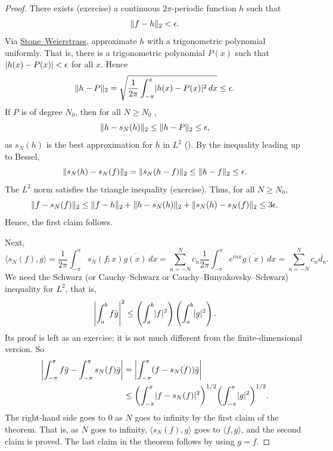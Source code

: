 \begin{proof}
There exists (exercise)
a continuous $2\pi$-periodic function $h$ such that
\begin{equation*}
\lVert {f-h} \rVert_2 < \epsilon .
\end{equation*}
Via \hyperref[thm:SWcomplex]{Stone--Weierstrass},
approximate $h$ with a trigonometric polynomial
uniformly.  That is, there is a trigonometric polynomial $P(x)$
such that
$\lvert {h(x) - P(x)} \rvert < \epsilon$ for all $x$.
Hence
\begin{equation*}
\lVert {h-P} \rVert_2
=
\sqrt{
\frac{1}{2\pi}
\int_{-\pi}^{\pi}
\lvert {h(x)-P(x)} \rvert^2
\,
dx
}
\leq \epsilon.
\end{equation*}
If $P$ is of degree $N_0$, then for all $N \geq N_0$ ,
\begin{equation*}
\lVert {h-s_N(h)} \rVert_2 \leq \lVert {h-P} \rVert_2 \leq \epsilon ,
\end{equation*}
as $s_N(h)$ is the best approximation for $h$ in $L^2$ ().
By the inequality leading up to Bessel,
\begin{equation*}
\lVert {s_N(h)-s_N(f)} \rVert_2
=
\lVert {s_N(h-f)} \rVert_2
\leq
\lVert {h-f} \rVert_2 \leq \epsilon .
\end{equation*}
The $L^2$ norm satisfies the triangle inequality (exercise).
Thus, for all $N \geq N_0$,
\begin{equation*}
\lVert {f-s_N(f)} \rVert_2
\leq
\lVert {f-h} \rVert_2
+
\lVert {h-s_N(h)} \rVert_2
+
\lVert {s_N(h)-s_N(f)} \rVert_2
\leq 3\epsilon .
\end{equation*}
Hence, the first claim follows.

Next,
\begin{equation*}
\langle s_N(f) , g \rangle
=
\frac{1}{2\pi}
\int_{-\pi}^\pi
s_N(f;x) \overline{g(x)} \, dx
=
\sum_{n=-N}^N
c_n 
\frac{1}{2\pi}
\int_{-\pi}^\pi
e^{inx}
\overline{g(x)} \, dx
=
\sum_{n=-N}^N
c_n 
\overline{d_n} .
\end{equation*}
We need the Schwarz (or Cauchy--Schwarz or Cauchy--Bunyakovsky--Schwarz)
inequality for $L^2$, that is,
\begin{equation*}
{\left\lvert {\int_a^b f\bar{g}} \right\rvert}^2
\leq
\left( \int_a^b \lvert {f} \rvert^2 \right)
\left( \int_a^b \lvert {g} \rvert^2 \right) .
\end{equation*}
Its proof is left as an exercise; it is not much
different from the finite-dimensional version.
So
\begin{equation*}
\begin{split}
\left\lvert {\int_{-\pi}^\pi f\bar{g} - \int_{-\pi}^\pi s_N(f)\bar{g}} \right\rvert
& =
\left\lvert {\int_{-\pi}^\pi (f- s_N(f))\bar{g}} \right\rvert \\
& \leq
{\left(\int_{-\pi}^\pi \lvert {f- s_N(f)} \rvert^2 \right)}^{1/2}
{\left( \int_{-\pi}^\pi \lvert {g} \rvert^2 \right)}^{1/2} .
\end{split}
\end{equation*}
The right-hand side goes to 0 as $N$ goes to infinity by the first
claim of the theorem.
That is, as $N$ goes to infinity, $\langle s_N(f),g \rangle$
goes to $\langle f,g \rangle$, and
the second claim is proved.  The last claim in the theorem follows by using
$g=f$.
\end{proof}

